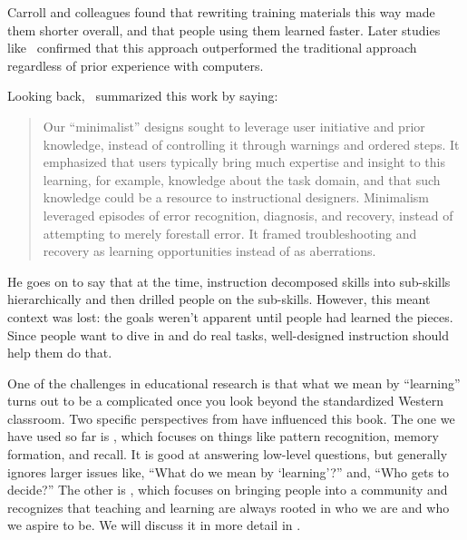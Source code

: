 Carroll and colleagues found that rewriting training materials this way
made them shorter overall, and that people using them learned faster.
Later studies like~\cite{Lazo1993} confirmed that this approach
outperformed the traditional approach regardless of prior experience
with computers.

Looking back,~\cite{Carr2014} summarized this work by saying:

\begin{quote}

Our ``minimalist'' designs sought to leverage user initiative and prior
knowledge, instead of controlling it through warnings and ordered
steps. It emphasized that users typically bring much expertise and
insight to this learning, for example, knowledge about the task
domain, and that such knowledge could be a resource to instructional
designers. Minimalism leveraged episodes of error recognition,
diagnosis, and recovery, instead of attempting to merely forestall
error. It framed troubleshooting and recovery as learning
opportunities instead of as aberrations.

\end{quote}

He goes on to say that at the time, instruction decomposed skills into
sub-skills hierarchically and then drilled people on the sub-skills.
However, this meant context was lost: the goals weren't apparent until
people had learned the pieces. Since people want to dive in and do real
tasks, well-designed instruction should help them do that.


One of the challenges in educational research is that
what we mean by ``learning'' turns out to be a complicated
once you look beyond the standardized Western classroom.
Two specific perspectives from 
have influenced this book.
The one we have used so far is ,
which focuses on things like pattern recognition, memory formation, and recall.
It is good at answering low-level questions,
but generally ignores larger issues like,
``What do we mean by `learning'?'' and, ``Who gets to decide?''
The other is ,
which focuses on bringing people into a community
and recognizes that
teaching and learning are always rooted in who we are and who we aspire to be.
We will discuss it in more detail in .

